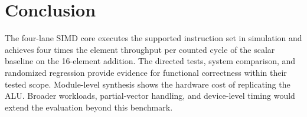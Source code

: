 \documentclass[conference]{IEEEtran}
\begin{document}
\section{Conclusion}
The four-lane SIMD core executes the supported instruction set in
simulation and achieves four times the element throughput per counted
cycle of the scalar baseline on the 16-element addition. The directed
tests, system comparison, and randomized regression provide evidence for
functional correctness within their tested scope. Module-level synthesis
shows the hardware cost of replicating the ALU. Broader workloads,
partial-vector handling, and device-level timing would extend the
evaluation beyond this benchmark.

\newpage


\end{document}
